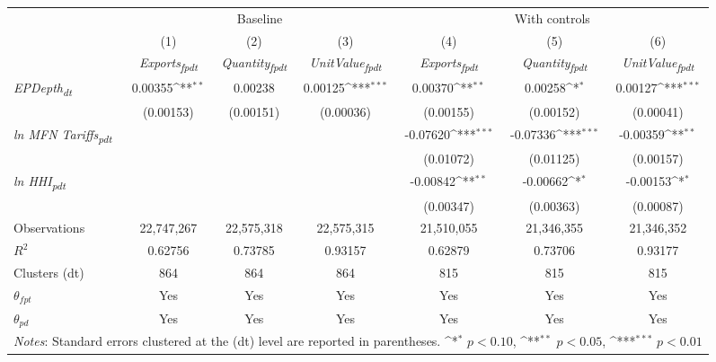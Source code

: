 {
\def\sym#1{\ifmmode^{#1}\else\(^{#1}\)\fi}
\begin{tabular}{l*{6}{c}}
\toprule
&\multicolumn{3}{c}{Baseline}&\multicolumn{3}{c}{With controls}\\\cmidrule(lr){2-4}\cmidrule(lr){5-7}
&(1)&(2)&(3)&(4)&(5)&(6)\\
&\textit{Exports\textsubscript{fpdt}}&\textit{Quantity\textsubscript{fpdt}}&\textit{UnitValue\textsubscript{fpdt}}&\textit{Exports\textsubscript{fpdt}}&\textit{Quantity\textsubscript{fpdt}}&\textit{UnitValue\textsubscript{fpdt}}\\
\midrule
\textit{EPDepth\textsubscript{dt}} & 0.00355\sym{**} & 0.00238 & 0.00125\sym{***} & 0.00370\sym{**} & 0.00258\sym{*} & 0.00127\sym{***}\\
 & (0.00153) & (0.00151) & (0.00036) & (0.00155) & (0.00152) & (0.00041)\\
\addlinespace
\textit{ln MFN Tariffs\textsubscript{pdt}} &  &  &  & -0.07620\sym{***} & -0.07336\sym{***} & -0.00359\sym{**}\\
 &  &  &  & (0.01072) & (0.01125) & (0.00157)\\
\addlinespace
\textit{ln HHI\textsubscript{pdt}} &  &  &  & -0.00842\sym{**} & -0.00662\sym{*} & -0.00153\sym{*}\\
 &  &  &  & (0.00347) & (0.00363) & (0.00087)\\
\midrule
Observations & 22,747,267 & 22,575,318 & 22,575,315 & 21,510,055 & 21,346,355 & 21,346,352\\
$R^{2}$ & 0.62756 & 0.73785 & 0.93157 & 0.62879 & 0.73706 & 0.93177\\
Clusters (dt) & 864 & 864 & 864 & 815 & 815 & 815\\
$\theta_{fpt}$ & Yes & Yes & Yes & Yes & Yes & Yes\\
$\theta_{pd}$ & Yes & Yes & Yes & Yes & Yes & Yes\\
\bottomrule
\multicolumn{7}{l}{\footnotesize \textit{Notes}: Standard errors clustered at the (dt) level are reported in parentheses. \sym{*} \(p<0.10\), \sym{**} \(p<0.05\), \sym{***} \(p<0.01\)}\\
\end{tabular}
}
